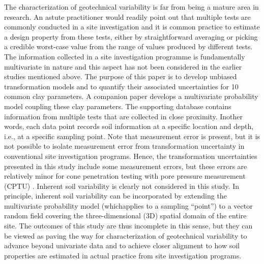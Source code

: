 \begin{paracol}{2}
    The characterization of geotechnical variability is far from being a mature area in research. An astute practitioner would readily point out that multiple tests are commonly conducted in a site investigation and it is common practice to estimate a design property from these tests, either by straightforward averaging or picking a credible worst-case value from the range of values produced by different tests. The information collected in a site investigation programme is fundamentally multivariate in nature and this aspect has not been considered in the earlier studies mentioned above. The purpose of this paper is to develop unbiased transformation models and to quantify their associated uncertainties for 10 common clay parameters. A companion paper \citep{Ching2014686} develops a multivariate probability model coupling these clay parameters. The supporting database contains information from multiple tests that are collected in close proximity. Inother words, each data point records soil information at a specific location and depth, i.e., at a specific sampling point. Note that measurement error is present, but it is not possible to isolate measurement error from transformation uncertainty in conventional site investigation programs. Hence, the transformation uncertainties presented in this study include some measurement errors, but these errors are relatively minor for cone penetration testing with pore pressure measurement (CPTU) \citep{Phoon1999612}. Inherent soil variability is clearly not considered in this study. In principle, inherent soil variability can be incorporated by extending the multivariate probability model (whichapplies to a sampling “point”) to a vector random field covering the three-dimensional (3D) spatial domain of the entire site. The outcomes of this study are thus incomplete in this sense, but they can be viewed as paving the way for characterization of geotechnical variability to advance beyond univariate data and to achieve closer alignment to how soil properties are estimated in actual practice from site investigation programs.

    \switchcolumn


\end{paracol}
